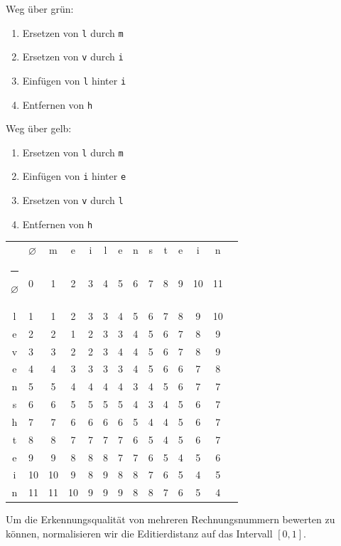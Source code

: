 \documentclass{whswinvcbook}
\makeatletter
\newcommand{\thickhline}{%
    \noalign {\ifnum 0=`}\fi \hrule height 1pt
    \futurelet \reserved@a \@xhline
}
\makeatother
\begin{document}
\begin{varwidth}[t]{.5\textwidth}
    Weg über grün:
    \begin{enumerate}
        \item Ersetzen von \texttt{l} durch \texttt{m}
        \item Ersetzen von \texttt{v} durch \texttt{i}
        \item Einfügen von \texttt{l} hinter \texttt{i}
        \item Entfernen von \texttt{h}
    \end{enumerate}
\end{varwidth}
\begin{varwidth}[t]{.5\textwidth}
    Weg über gelb:
    \begin{enumerate}
        \item Ersetzen von \texttt{l} durch \texttt{m}
        \item Einfügen von \texttt{i} hinter \texttt{e}
        \item Ersetzen von \texttt{v} durch \texttt{l}
        \item Entfernen von \texttt{h}
    \end{enumerate}
\end{varwidth}
\begin{center}
    \begin{tabular}{|cTc|c|c|c|c|c|c|c|c|c|c|c|}
        \hline
        & $\varnothing$ & m & e & i & l & e & n & s & t & e & i & n\\\thickhline
        $\varnothing$ & 0 & 1 & 2 & 3 & 4 & 5 & 6 & 7 & 8 & 9 & 10 & 11\\\hline
        l & 1 & 1 & 2 & 3 & 3 & 4 & 5 & 6 & 7 & 8 & 9 & 10\\\hline
        e & 2 & 2 & 1 & 2 & 3 & 3 & 4 & 5 & 6 & 7 & 8 & 9\\\hline
        v & 3 & 3 & 2 & 2 & 3 & 4 & 4 & 5 & 6 & 7 & 8 & 9\\\hline
        e & 4 & 4 & 3 & 3 & 3 & 3 & 4 & 5 & 6 & 6 & 7 & 8\\\hline
        n & 5 & 5 & 4 & 4 & 4 & 4 & 3 & 4 & 5 & 6 & 7 & 7\\\hline
        s & 6 & 6 & 5 & 5 & 5 & 5 & 4 & 3 & 4 & 5 & 6 & 7\\\hline
        h & 7 & 7 & 6 & 6 & 6 & 6 & 5 & 4 & 4 & 5 & 6 & 7\\\hline
        t & 8 & 8 & 7 & 7 & 7 & 7 & 6 & 5 & 4 & 5 & 6 & 7\\\hline
        e & 9 & 9 & 8 & 8 & 8 & 7 & 7 & 6 & 5 & 4 & 5 & 6\\\hline
        i & 10 & 10 & 9 & 8 & 9 & 8 & 8 & 7 & 6 & 5 & 4 & 5\\\hline
        n & 11 & 11 & 10 & 9 & 9 & 9 & 8 & 8 & 7 & 6 & 5 & 4\\\hline
    \end{tabular}
\end{center}
Um die Erkennungsqualität von mehreren Rechnungsnummern bewerten zu können, normalisieren wir die Editierdistanz auf das Intervall $[0,1]$.
\end{document}
